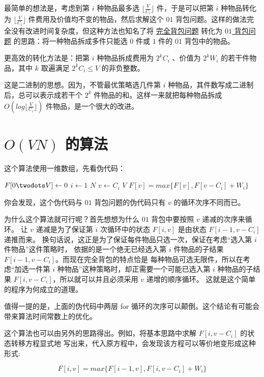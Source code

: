 \documentclass[cn, 11pt, chinese, toc=twocol]{elegantbook}
\begin{document}
最简单的想法是，考虑到第 $i$ 种物品最多选 $\lfloor \frac{V}{C_i} \rfloor$ 件，于是可以把第 $i$ 种物品转化为 $\lfloor \frac{V}{C_i} \rfloor$ 件费用及价值均不变的物品，然后求解这个 $01$ 背包问题。这样的做法完全没有改进时间复杂度，但这种方法也知名了将 \underline{完全背包问题} 转化为 \underline{$01$ 背包问题} 的思路：将一种物品拆成多件只能选 $0$ 件或 $1$ 件的 $01$ 背包中的物品。

更高效的转化方法是：把第 $i$ 种物品拆成费用为 $2^k C_i$ 、价值为 $2^k W_i$ 的若干件物品，其中 $k$ 取遍满足 $2^kC_i \le V$ 的非负整数。

这是二进制的思想。因为，不管最优策略选几件第 $i$ 种物品，其件数写成二进制后，总可以表示成若干个 $2^k$ 件物品的和。这样一来就把每种物品拆成 $O(log\lfloor \frac{V}{C_i} \rfloor)$ 件物品，是一个很大的改进。

\section{$O(VN)$ 的算法}

这个算法使用一维数组，先看伪代码：
\begin{codebox}
  \li $F[0 \twodots V] \leftarrow 0$ 
  \li \For $i \gets 1$ \To $N$
        \Do
  \li     \For $v \gets C_i$ \To $V$
          \Do
  \li        $F[v] = max\{ F[v], F[v - C_i] + W_i\}$
          \End
        \End
\end{codebox}

你会发现，这个伪代码与 $01$ 背包问题的伪代码只有 $v$ 的循环次序不同而已。

为什么这个算法就可行呢？首先想想为什么 $01$ 背包中要按照 $v$ 递减的次序来循环。
让 $v$ 递减是为了保证第 $i$ 次循环中的状态 $F[i,v]$ 是由状态 $F[i - 1,v - C_i]$ 递推而来。
换句话说，这正是为了保证每件物品只选一次，保证在考虑“选入第 $i$ 件物品”这件策略时，
依据的是一个绝无已经选入第 $i$ 件物品的子结果 $F[i - 1, v - C_i]$。而现在完全背包的特点恰是
每种物品可选无限件，所以在考虑“加选一件第 $i$ 种物品”这种策略时，却正需要一个可能已选入第 $i$ 
种物品的子结果 $F[i, v - C_i]$，所以就可以并且必须采用 $v$ 递增的顺序循环。
这就是这个简单的程序为何成立的道理。

值得一提的是，上面的伪代码中两层 for 循环的次序可以颠倒。这个结论有可能会带来算法时间常数上的优化。

这个算法也可以由另外的思路得出。例如，将基本思路中求解 $F[i, v - C_i]$ 的状态转移方程显式地
写出来，代入原方程中，会发现该方程可以等价地变形成这种形式:

\begin{equation}
  F[i, v] = max\{ F[i - 1, v], F[i, v - C_i] + W_i \}
\end{equation}
\end{document}
